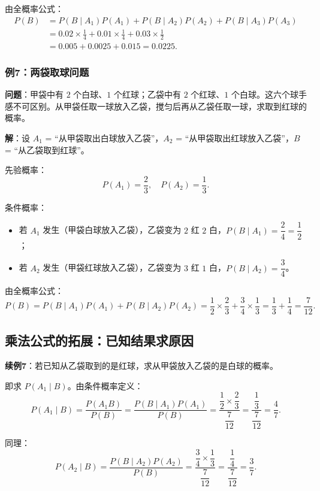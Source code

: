 \documentclass[11pt,a4paper]{report}
\theoremstyle{definition}
\begin{document}
由全概率公式：
\begin{align*}
P(B) &= P(B \mid A_1)P(A_1) + P(B \mid A_2)P(A_2) + P(B \mid A_3)P(A_3) \\
&= 0.02 \times \frac{1}{4} + 0.01 \times \frac{1}{4} + 0.03 \times \frac{1}{2} \\
&= 0.005 + 0.0025 + 0.015 = \boxed{0.0225}.
\end{align*}

\subsubsection{例7：两袋取球问题}

\textbf{问题}：甲袋中有 $2$ 个白球、$1$ 个红球；乙袋中有 $2$ 个红球、$1$ 个白球。这六个球手感不可区别。从甲袋任取一球放入乙袋，搅匀后再从乙袋任取一球，求取到红球的概率。

\textbf{解}：设 $A_1$ = ``从甲袋取出白球放入乙袋''，$A_2$ = ``从甲袋取出红球放入乙袋''，$B$ = ``从乙袋取到红球''。

先验概率：
\[
P(A_1) = \frac{2}{3}, \quad P(A_2) = \frac{1}{3}.
\]

条件概率：
\begin{itemize}[leftmargin=2em]
    \item 若 $A_1$ 发生（甲袋白球放入乙袋），乙袋变为 $2$ 红 $2$ 白，$P(B \mid A_1) = \dfrac{2}{4} = \dfrac{1}{2}$；
    \item 若 $A_2$ 发生（甲袋红球放入乙袋），乙袋变为 $3$ 红 $1$ 白，$P(B \mid A_2) = \dfrac{3}{4}$。
\end{itemize}

由全概率公式：
\[
P(B) = P(B \mid A_1)P(A_1) + P(B \mid A_2)P(A_2) = \frac{1}{2} \times \frac{2}{3} + \frac{3}{4} \times \frac{1}{3} = \frac{1}{3} + \frac{1}{4} = \boxed{\frac{7}{12}}.
\]

\subsection{乘法公式的拓展：已知结果求原因}

\textbf{续例7}：若已知从乙袋取到的是红球，求从甲袋放入乙袋的是白球的概率。

即求 $P(A_1 \mid B)$。由条件概率定义：
\[
P(A_1 \mid B) = \frac{P(A_1 B)}{P(B)} = \frac{P(B \mid A_1) P(A_1)}{P(B)} = \frac{\dfrac{1}{2} \times \dfrac{2}{3}}{\dfrac{7}{12}} = \frac{\dfrac{1}{3}}{\dfrac{7}{12}} = \boxed{\frac{4}{7}}.
\]

同理：
\[
P(A_2 \mid B) = \frac{P(B \mid A_2) P(A_2)}{P(B)} = \frac{\dfrac{3}{4} \times \dfrac{1}{3}}{\dfrac{7}{12}} = \frac{\dfrac{1}{4}}{\dfrac{7}{12}} = \frac{3}{7}.
\]
\end{document}
